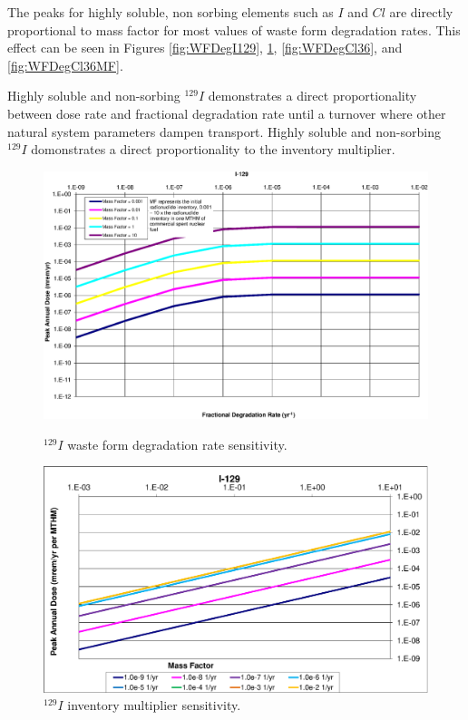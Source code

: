 \clearpage 
The peaks for highly soluble, non sorbing elements such as $I$ and $Cl$
are directly proportional to mass factor for most 
values of waste form degradation rates. This effect can be seen in Figures 
\ref{fig:WFDegI129}, \ref{fig:WFDegI129MF}, \ref{fig:WFDegCl36}, and 
\ref{fig:WFDegCl36MF}. 


Highly soluble and non-sorbing $^{129}I$ demonstrates a direct proportionality between dose rate and 
fractional degradation rate until a turnover where other natural system 
parameters dampen transport. Highly soluble and non-sorbing $^{129}I$ domonstrates a direct 
proportionality to the inventory multiplier.

\begin{figure}[ht!]
\begin{minipage}[b]{0.45\linewidth}
\centering
\includegraphics[width=\linewidth]{./chapters/nuclide_sensitivity/clay/WFDegAndInv/I-129.eps}
\caption{$^{129}I$ waste form degradation rate sensitivity.}
\label{fig:WFDegI129}

\end{minipage}
\hspace{0.05\linewidth}
\begin{minipage}[b]{0.45\linewidth}

\includegraphics[width=\linewidth]{./chapters/nuclide_sensitivity/clay/WFDegAndInv/I-129-MF.eps}
\caption{$^{129}I$ inventory multiplier sensitivity.}
\label{fig:WFDegI129MF}

\end{minipage}
\end{figure}
